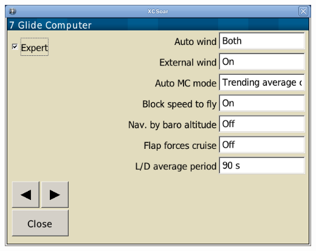 \begin{center}
\includegraphics[angle=0,width=0.8\linewidth,keepaspectratio='true']{figures/config-glidecomputer.png}
\end{center}

